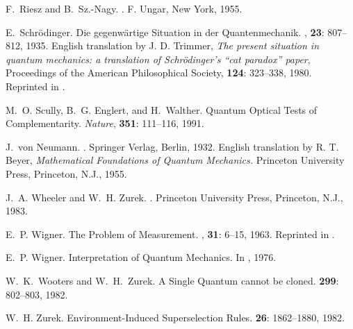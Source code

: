 \documentclass[12pt]{article}
\begin{document}
\begin{thebibliography}{10}
 F.~Riesz and B.~Sz.-{N}agy.  .  \newblock F. Ungar, New York, 1955.

 E.~Schr{\"o}dinger.  \newblock Die gegenw{\"a}rtige
   {S}ituation in der {Q}uantenmechanik.  , {\bf 23}: 807--812, 1935.  \newblock English
   translation by J. D. Trimmer, {\it The present situation in quantum
     mechanics: a translation of Schr{\"o}dinger's ``cat paradox''
     paper}, Proceedings of the American Philosophical Society, {\bf
     124}: 323--338, 1980.  Reprinted in \cite{WZ83}.

 M.~O. Scully, B.~G. Englert, and H.~Walther.
   \newblock Quantum {O}ptical {T}ests of {C}omplementarity.  \newblock
   {\em Nature}, {\bf 351}: 111--116, 1991.

 J.~von Neumann.  .  \newblock Springer Verlag,
   Berlin, 1932.  \newblock English translation by R. T. Beyer, {\it
     Mathematical Foundations of Quantum Mechanics.} Princeton
   University Press, Princeton, N.J., 1955.

 J.~A. Wheeler and W.~H. Zurek.  .  \newblock Princeton University
   Press, Princeton, N.J., 1983.

 E.~P. Wigner.  \newblock The {P}roblem of
   {M}easurement.  , {\bf
     31}: 6--15, 1963.  \newblock Reprinted in \cite{WZ83}.

 E.~P. Wigner.  \newblock Interpretation of {Q}uantum
   {M}echanics.  \newblock In \cite{WZ83}, 1976.

 W.~K.~Wooters and W.~H.~Zurek.  \newblock A Single
   Quantum cannot be cloned.   {\bf 299}:
   802--803, 1982.

 W.~H. Zurek.  \newblock Environment-{I}nduced
   {S}uperselection {R}ules.   {\bf
     26}: 1862--1880, 1982.

\end{thebibliography}
\end{document}
